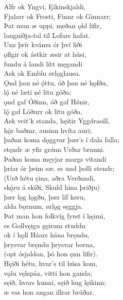 \bva Alfr ok Yngvi, \hld Ęikinskjaldi, \\%
Fjalarr ok Frosti, \hld Finnr ok Ginnarr; \\%
Þat mun æ uppi, \hld meðan ǫld lifir, \\%
langniðja-tal \hld til Lofars hafat.\\%

\bva Unz þrír kvámu \hld ór því liði \\%
ǫflgir ok ástkir \hld æsir at húsi, \\%
fundu á landi \hld lítt męgandi \\%
Ask ok Emblu \hld ørlǫglausa.\\%

\bva Ǫnd þau né ǫ́ttu, \hld óð þau né hǫfðu, \\%
lǫ́ né læti \hld né litu góða; \\%
ǫnd gaf Óðinn, \hld óð gaf Hǿnir, \\%
lǫ́ gaf Lóðurr \hld ok litu góða.\\%

\bva Ask veit'k standa, \hld hęitir Yggdrasill, \\%
hǫ́r baðmr, ausinn \hld hvíta auri; \\%
þaðan koma dǫggvar \hld þær's í dala falla; \\%
stęndr æ yfir grǿnn \hld Urðar brunni.\\%

\bva Þaðan koma męyjar \hld margs vitandi \\%
þríar ór þeim sæ, \hld es und þolli stendr; \\%
(Urð hétu ęina, \hld aðra Verðandi, \\%
skǫ́ru á skíði, \hld Skuld hina þriðju) \\%
þær lǫg lǫgðu, \hld þær líf køru, \\%
alda bǫrnum, \hld ørlǫg sęggja.\\%

\bva Þat man hon folkvíg \hld fyrst í hęimi, \\%
es Gollvęigu \hld gęirum studdu \\%
ok í hǫll Háars \hld hána bręndu, \\%
þrysvar bręndu \hld þrysvar borna, \\%
(opt ósjaldan, \hld þó hon ęnn lifir).\\%

\bva Hęiði hétu, \hld hvar's til húsa kom, \\%
vǫlu vęlspáa, \hld vitti hon ganda; \\%
sęið, hvars kunni, \hld sęið hug lęikinn; \\%
æ vas hon angan \hld illrar brúðar.\\%

